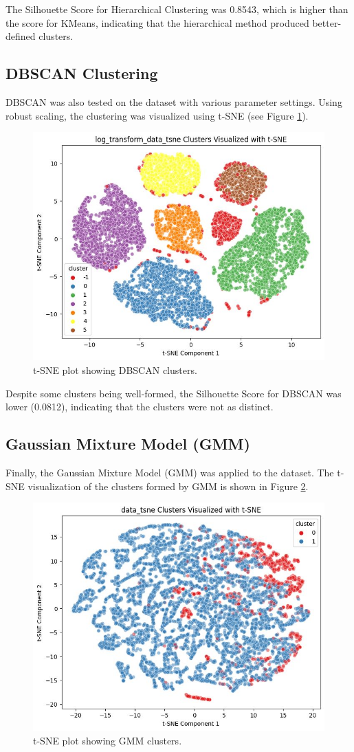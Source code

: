 \documentclass[runningheads,a4paper]{llncs}
\begin{document}
The Silhouette Score for Hierarchical Clustering was 0.8543, which is higher than the score for KMeans, indicating that the hierarchical method produced better-defined clusters.

\subsection{DBSCAN Clustering}

DBSCAN was also tested on the dataset with various parameter settings. Using robust scaling, the clustering was visualized using t-SNE (see Figure \ref{fig:dbscan_tsne}).

\begin{figure}[h]
    \centering
    \includegraphics[width=0.4\linewidth]{dbscan-tsne.jpeg} %
    \caption{t-SNE plot showing DBSCAN clusters.}
    \label{fig:dbscan_tsne}
\end{figure}

Despite some clusters being well-formed, the Silhouette Score for DBSCAN was lower (0.0812), indicating that the clusters were not as distinct.

\subsection{Gaussian Mixture Model (GMM)}

Finally, the Gaussian Mixture Model (GMM) was applied to the dataset. The t-SNE visualization of the clusters formed by GMM is shown in Figure \ref{fig:gmm_tsne}.

\begin{figure}[h]
    \centering
    \includegraphics[width=0.4\linewidth]{gmm-tsne.jpeg} %
    \caption{t-SNE plot showing GMM clusters.}
    \label{fig:gmm_tsne}
\end{figure}
\end{document}
